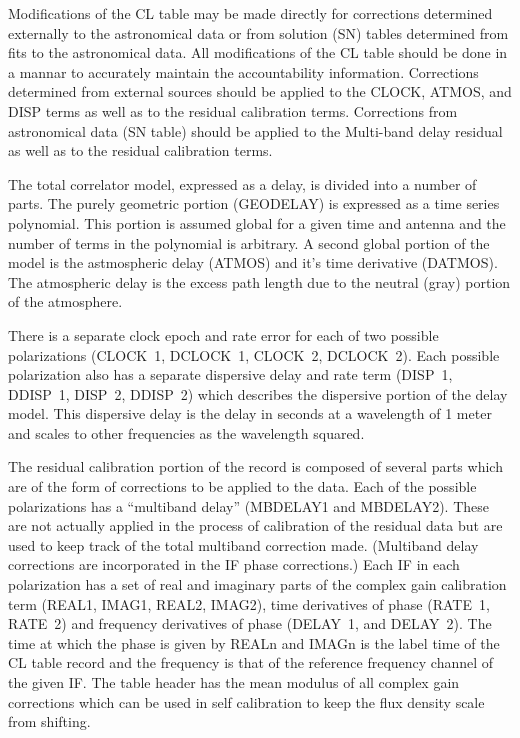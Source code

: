   Modifications of the CL table may be made directly for
corrections determined externally to the astronomical data or
from solution (SN) tables determined from fits to the astronomical data.
All modifications of the CL table should be done in a mannar to
accurately maintain the accountability information.  Corrections
determined from external sources should be applied to the CLOCK,
ATMOS, and DISP terms as well as to the residual calibration terms. 
Corrections from astronomical data (SN table) should be applied to the
Multi-band delay residual as well as to the residual calibration
terms. 

   The total correlator model, expressed as a delay, is divided
into a number of parts.  The purely geometric portion (GEODELAY) is
expressed as a time series polynomial.  This portion is assumed global
for a given time and antenna and the number of terms in the polynomial
is arbitrary.  A second global portion of the model is the
astmospheric delay (ATMOS) and it's time derivative (DATMOS).  The
atmospheric delay is the excess path length due to the neutral (gray)
portion of the atmosphere.

   There is a separate clock epoch and rate error for each of two
possible polarizations (CLOCK~1, DCLOCK~1, CLOCK~2, DCLOCK~2).  Each
possible polarization also has a separate dispersive delay and rate
term (DISP~1, DDISP~1, DISP~2, DDISP~2) which describes the dispersive
portion of the delay model.  This dispersive delay is the delay in
seconds at a wavelength of 1 meter and scales to other frequencies as
the wavelength squared.

   The residual calibration portion of the record is composed of
several parts which are of the form of corrections to be applied to
the data.  Each of the possible polarizations has a ``multiband
delay'' (MBDELAY1 and MBDELAY2).  These are not actually applied in
the process of calibration of the residual data but are used to keep
track of the total multiband correction made.  (Multiband delay
corrections are incorporated in the IF phase corrections.)  Each IF in
each polarization has a set of real and imaginary parts of the complex
gain calibration term (REAL1, IMAG1, REAL2, IMAG2), time derivatives
of phase (RATE~1, RATE~2) and frequency derivatives of phase (DELAY~1,
and DELAY~2).  The time at which the phase is given by REALn and IMAGn
is the label time of the CL table record and the frequency is that of
the reference frequency channel of the given IF.  The table header has
the mean modulus of all complex gain corrections which can be used in
self calibration to keep the flux density scale from shifting.

